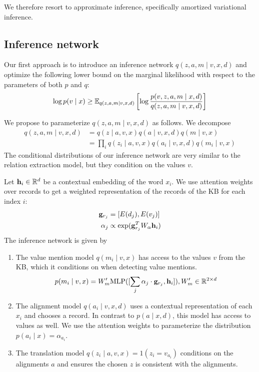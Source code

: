 \documentclass[12pt]{article}
\begin{document}
We therefore resort to approximate inference,
specifically amortized variational inference.

\subsection{Inference network}
Our first approach is to introduce an inference network $q(z,a,m\mid v,x,d)$
and optimize the following lower bound on the marginal likelihood
with respect to the parameters of both $p$ and $q$:
\begin{equation}
\label{eqn:lowerbound}
\log p(v\mid x) \geq
\mathbb{E}_{q(z,a,m\mid v,x,d)}\left[\log \frac{p(v,z,a,m\mid x,d)}{q(z,a,m\mid v,x,d)}\right]
\end{equation}

We propose to parameterize $q(z,a,m\mid v,x,d)$ as follows.
We decompose 
\begin{equation}
\label{eqn:elbo}
\begin{aligned}
q(z,a,m\mid v,x,d) &= q(z \mid a,v,x)q(a\mid v,x,d)q(m \mid v,x)\\
&= \prod_i q(z_i \mid a,v,x)q(a_i \mid v,x,d)q(m_i \mid v,x)
\end{aligned}
\end{equation}
The conditional distributions of our inference network
are very similar to the relation extraction model,
but they condition on the values $v$.

Let $\mathbf{h}_i \in \mathbb{R}^d$ be a contextual embedding of the word $x_i$.
We use attention weights over records to get a weighted representation
of the records of the KB for each index $i$:
\begin{align*}
\mathbf{g}_{r_j} &= [E(d_j), E(v_j)]\\
\alpha_j &\propto \exp(\mathbf{g}_{r_j}^T W_\alpha \mathbf{h}_i)
\end{align*}
The inference network is given by
\begin{enumerate}
\item The value mention model $q(m_i \mid v,x)$ 
    has access to the values $v$ from the KB, which it conditions on
    when detecting value mentions. 
    $$p(m_i \mid v,x) = W_m' \textrm{MLP}([\sum_j \alpha_j \cdot \mathbf{g}_{r_j}, \mathbf{h}_i]), W'_m \in \mathbb{R}^{2 \times d}$$
\item The alignment model $q(a_i \mid v,x,d)$
    uses a contextual representation of each $x_i$ and chooses a record.
    In contrast to $p(a\mid x,d)$, this model has access to values as well.
    We use the attention weights to parameterize the distribution
    $p(a_i \mid x) = \alpha_{a_i}$.
\item The translation model $q(z_i \mid a,v,x) = 1(z_i = v_{a_i})$
    conditions on the alignments $a$ and ensures the chosen $z$ is consistent
    with the alignments. 
\end{enumerate}
\end{document}
